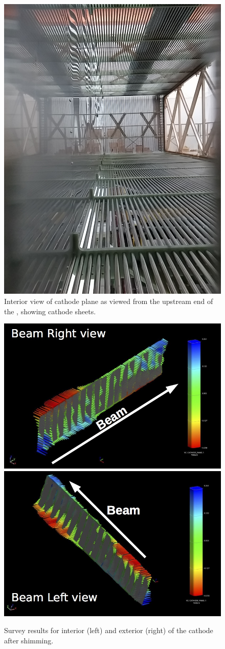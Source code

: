 \begin{figure}[htb]
\centering	
\includegraphics[width=0.55\linewidth]{figures/tpc-upstream-interior.jpg}
\caption{Interior view of cathode plane as viewed from the upstream end of the \lartpc, showing cathode sheets.}
\label{fig:tpc-cathode-interior}
\end{figure}

\begin{figure}[htb]
\centering
\includegraphics[width=0.45\linewidth]{figures/cathode_right.jpg}
\includegraphics[width=0.45\linewidth]{figures/cathode_left.jpg}
\caption{Survey results for interior (left) and exterior (right) of the cathode after shimming.}
\label{fig:tpc-cathode-survey}
\end{figure}


